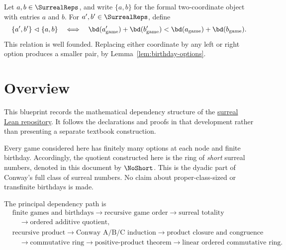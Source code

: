 \begin{definition}
  \label{def:surreal-pair-induction}
  \leanok
  Let \(a,b\in\SurrealReps\), and write \(\{a,b\}\) for the formal two-coordinate object with
  entries \(a\) and \(b\).  For \(a',b'\in\SurrealReps\), define
  \[
    \{a',b'\}\mathrel{\vartriangleleft}\{a,b\}
      \quad\Longleftrightarrow\quad
    \bd(a'_{\mathrm{game}})+\bd(b'_{\mathrm{game}})
      <\bd(a_{\mathrm{game}})+\bd(b_{\mathrm{game}}).
  \]
  This relation is well founded.  Replacing either coordinate by any left or right option
  produces a smaller pair, by Lemma~\ref{lem:birthday-options}.
\end{definition}


\chapter{Overview}

This blueprint records the mathematical dependency structure of the
\href{https://github.com/kdwong/surreal}{surreal Lean repository}.  It follows the declarations
and proofs in that development rather than presenting a separate textbook construction.

Every game considered here has finitely many options at each node and finite birthday.
Accordingly, the quotient constructed here is the ring of
\emph{short} surreal numbers, denoted in this document by \(\NoShort\).  This is the dyadic
part of Conway's full class of surreal numbers.  No claim about proper-class-sized or
transfinite birthdays is made.

The principal dependency path is
\[
\begin{aligned}
  &\text{finite games and birthdays}
  \longrightarrow \text{recursive game order}
  \longrightarrow \text{surreal totality} \\
  &\quad\longrightarrow \text{ordered additive quotient},\\[2mm]
  &\text{recursive product}
  \longrightarrow \text{Conway A/B/C induction}
  \longrightarrow \text{product closure and congruence}\\
  &\quad\longrightarrow \text{commutative ring}
  \longrightarrow \text{positive-product theorem}
  \longrightarrow \text{linear ordered commutative ring}.
\end{aligned}
\]

